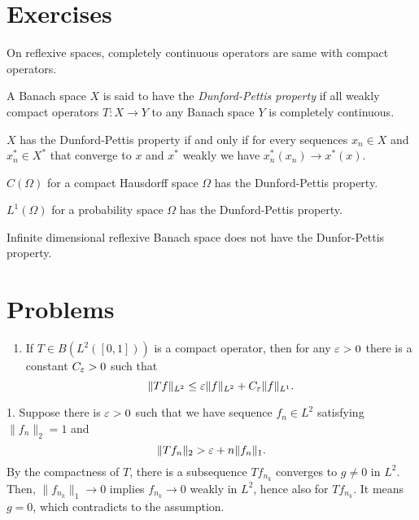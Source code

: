 \documentclass{../../large}
\begin{document}
\section*{Exercises}

\begin{prb}
On reflexive spaces, completely continuous operators are same with compact operators.
\end{prb}


\begin{prb}
A Banach space $X$ is said to have the \emph{Dunford-Pettis property} if all weakly compact operators $T:X\to Y$ to any Banach space $Y$ is completely continuous.
\begin{parts}
\item $X$ has the Dunford-Pettis property if and only if for every sequences $x_n\in X$ and $x^*_n\in X^*$ that converge to $x$ and $x^*$ weakly we have $x^*_n(x_n)\to x^*(x)$.
\item $C(\Omega)$ for a compact Hausdorff space $\Omega$ has the Dunford-Pettis property.
\item $L^1(\Omega)$ for a probability space $\Omega$ has the Dunford-Pettis property.
\item Infinite dimensional reflexive Banach space does not have the Dunfor-Pettis property.
\end{parts}
\end{prb}




\section*{Problems}
\begin{enumerate}
\item If $T\in B(L^2([0,1]))$ is a compact operator, then for any $\varepsilon>0$ there is a constant $C_\varepsilon>0$ such that
\[\|Tf\|_{L^2}\le\varepsilon\|f\|_{L^2}+C_\varepsilon\|f\|_{L^1}.\]
\end{enumerate}

\begin{pf}
1. Suppose there is $\varepsilon>0$ such that we have sequence $f_n\in L^2$ satisfying $\|f_n\|_2=1$ and
\[\|Tf_n\|_2>\varepsilon+n\|f_n\|_1.\]
By the compactness of $T$, there is a subsequence $Tf_{n_k}$ converges to $g\ne0$ in $L^2$.
Then, $\|f_{n_k}\|_1\to0$ implies $f_{n_k}\to0$ weakly in $L^2$, hence also for $Tf_{n_k}$.
It means $g=0$, which contradicts to the assumption.
\end{pf}
\end{document}
